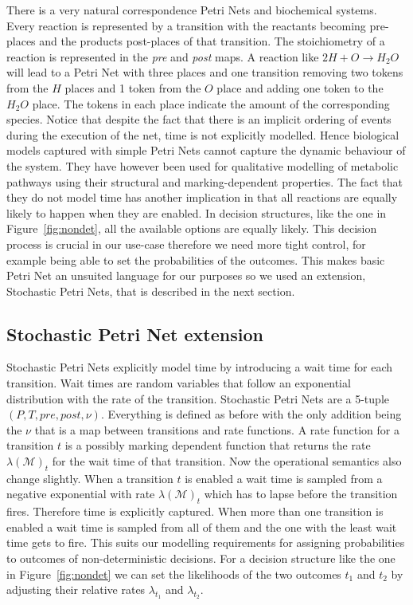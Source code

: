 There is a very natural correspondence Petri Nets and biochemical
systems. Every reaction is represented by a transition with the
reactants becoming pre-places and the products post-places of that
transition. The stoichiometry of a reaction is represented in the
\textit{pre} and \textit{post} maps. A reaction like $2H + O \rightarrow H_2O$ will lead
to a Petri Net with three places and one transition removing two
tokens from the $H$ places and 1 token from the $O$ place and adding
one token to the $H_2O$ place. The tokens in each place indicate the
amount of the corresponding species. Notice that despite the
fact that there is an implicit ordering of events during the execution
of the net, time is not explicitly modelled. Hence biological models
captured with simple Petri Nets cannot capture the dynamic behaviour
of the system. They have however been used for qualitative modelling
of metabolic pathways using their structural and
marking-dependent properties. The fact that they do not model time has
another implication in that all reactions are equally likely to
happen when they are enabled. In decision structures, like the one in
Figure~\ref{fig:nondet}, all the available options are equally
likely. This decision process is crucial in our use-case therefore we
need more tight control, for example being able to set the
probabilities of the outcomes. This makes basic Petri Net an unsuited
language for our purposes so we used an extension, Stochastic Petri
Nets, that is described in the next section.

\subsection{Stochastic Petri Net extension}
\label{sec:spn}
Stochastic Petri Nets explicitly model time by introducing a wait time
for each transition. Wait times are random variables that follow an
exponential distribution with the rate of the transition. Stochastic
Petri Nets are a 5-tuple $(P, T, pre, post, \nu)$. Everything is
defined as before with the only addition being the $\nu$ that is a
map between transitions and rate functions. A rate function for a
transition $t$ is a
possibly marking dependent function that returns the rate
$\lambda(\mathcal{M})_t$ for the wait time of that transition. Now the
operational semantics also change slightly. When a transition $t$ is
enabled a wait time is sampled from a negative exponential with rate
$\lambda(\mathcal{M})_t$ which has to lapse before the transition
fires. Therefore time is explicitly captured. When more than one
transition is enabled a wait time is sampled from all of them and the
one with the least wait time gets to fire. This suits our modelling
requirements for assigning probabilities to outcomes of
non-deterministic decisions. For a decision structure like the one in
Figure~\ref{fig:nondet} we can set the likelihoods of the two outcomes
$t_1$ and $t_2$ by adjusting their relative rates $\lambda_{t_1}$ and
$\lambda_{t_2}$. 

